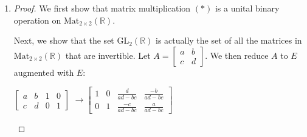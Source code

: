 \documentclass[12pt]{article}
\begin{document}
\begin{enumerate}[label = {\bfseries Question \arabic*:}, leftmargin=1in, itemsep=1.5em]
    \item \begin{proof} We first show that matrix multiplication $(\ast)$ is a unital binary operation on $\text{Mat}_{2\times 2}(\mathbb{R})$.
            Next, we show that the set $\text{GL}_2(\mathbb{R})$ is actually the set of all the matrices in $\text{Mat}_{2\times 2}(\mathbb{R})$ that are invertible. Let $A = \begin{bmatrix}
                a & b \\
                c & d
            \end{bmatrix}$. We then reduce $A$ to $E$ augmented with $E$: \begin{center}
                $\left[ \begin{array}{cc|cc}
                a & b & 1 & 0 \\
                c & d & 0 & 1
                \end{array} \right]$
                $ \rightarrow \left[ \begin{array}{cc|cc}
                1 & 0 & \frac{d}{ad-bc} & \frac{-b}{ad-bc} \\
                0 & 1 & \frac{-c}{ad-bc} & \frac{a}{ad-bc}
                \end{array} \right]$\\

\end{center}
\end{proof}
\end{enumerate}
\end{document}
